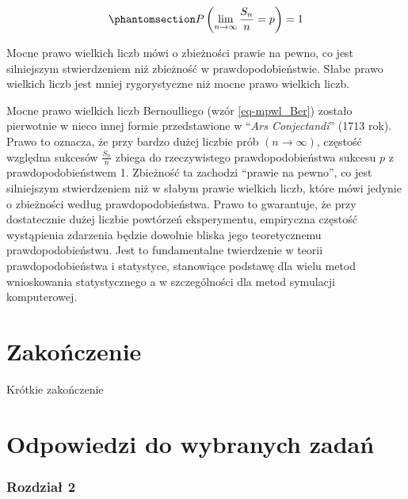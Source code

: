 \documentclass[
  letterpaper,
  DIV=11,
  numbers=noendperiod]{scrreprt}
\begin{document}
\begin{equation}\phantomsection\label{eq-mpwl_Ber}{ P\left(\lim_{n \to \infty} \frac{S_n}{n}=p  \right) =1}\end{equation}

Mocne prawo wielkich liczb mówi o zbieżności prawie na pewno, co jest
silniejszym stwierdzeniem niż zbieżność w prawdopodobieństwie. Słabe
prawo wielkich liczb jest mniej rygorystyczne niż mocne prawo wielkich
liczb.

Mocne prawo wielkich liczb Bernoulliego (wzór \ref{eq-mpwl_Ber}) zostało
pierwotnie w nieco innej formie przedstawione w ``\emph{Ars
Conjectandi}'' (1713 rok). Prawo to oznacza, że przy bardzo dużej
liczbie prób \((n \to \infty)\), częstość względna sukcesów
\(\frac{S_n}{n}\) zbiega do rzeczywistego prawdopodobieństwa sukcesu
\(p\) z prawdopodobieństwem 1. Zbieżność ta zachodzi ``prawie na
pewno'', co jest silniejszym stwierdzeniem niż w słabym prawie wielkich
liczb, które mówi jedynie o zbieżności według prawdopodobieństwa. Prawo
to gwarantuje, że przy dostatecznie dużej liczbie powtórzeń
eksperymentu, empiryczna częstość wystąpienia zdarzenia będzie dowolnie
bliska jego teoretycznemu prawdopodobieństwu. Jest to fundamentalne
twierdzenie w teorii prawdopodobieństwa i statystyce, stanowiące
podstawę dla wielu metod wnioskowania statystycznego a w szczególności
dla metod symulacji komputerowej.


\chapter*{Zakończenie}\label{zakoux144czenie}


Krótkie zakończenie


\chapter*{Odpowiedzi do wybranych
zadań}\label{odpowiedzi-do-wybranych-zadaux144}


\subsection*{Rozdział 2}\label{rozdziaux142-2}
\end{document}
